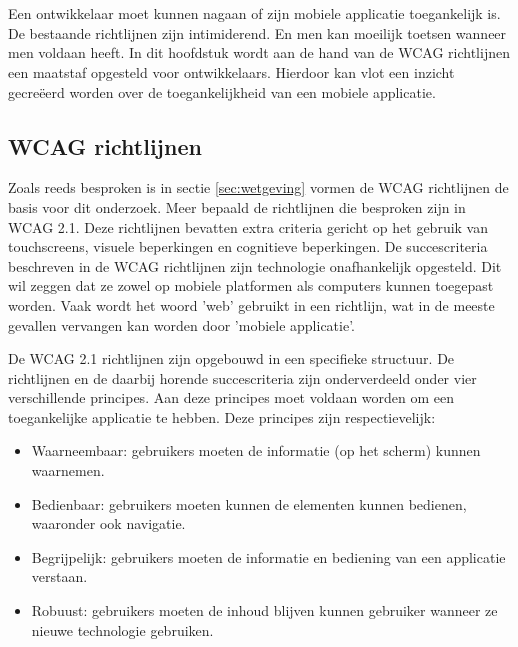 \chapter{}
\label{ch:Richtlijnen voor toegankelijkheid mobiele applicaties}
Een ontwikkelaar moet kunnen nagaan of zijn mobiele applicatie toegankelijk is. De bestaande richtlijnen zijn intimiderend. En men kan moeilijk toetsen wanneer men voldaan heeft. In dit hoofdstuk wordt aan de hand van de WCAG richtlijnen een maatstaf opgesteld voor ontwikkelaars. Hierdoor kan vlot een inzicht gecreëerd worden over de toegankelijkheid van een mobiele applicatie.

\section{WCAG richtlijnen}
\label{sec:WCAGrichtlijn}

Zoals reeds besproken is in sectie \ref{sec:wetgeving} vormen de WCAG richtlijnen de basis voor dit onderzoek. Meer bepaald de richtlijnen die besproken zijn in WCAG 2.1. Deze richtlijnen bevatten extra criteria gericht op het gebruik van touchscreens, visuele beperkingen en cognitieve beperkingen.
De succescriteria beschreven in de WCAG richtlijnen zijn technologie onafhankelijk opgesteld. Dit wil zeggen dat ze zowel op mobiele platformen als computers kunnen toegepast worden. Vaak wordt het woord 'web' gebruikt in een richtlijn, wat in de meeste gevallen vervangen kan worden door 'mobiele applicatie'.
 \autocite{w3cTechnologyNeutral}

De WCAG 2.1 richtlijnen zijn opgebouwd in een specifieke structuur. De richtlijnen en de daarbij horende succescriteria zijn onderverdeeld onder vier verschillende principes. Aan deze principes moet voldaan worden om een toegankelijke applicatie te hebben. Deze principes zijn respectievelijk: 
\begin{itemize}
    \item Waarneembaar: gebruikers moeten de informatie (op het scherm) kunnen waarnemen.
        \item Bedienbaar: gebruikers moeten kunnen de elementen kunnen bedienen, waaronder ook navigatie.
        \item Begrijpelijk: gebruikers moeten de informatie en bediening van een applicatie verstaan.
        \item Robuust: gebruikers moeten de inhoud blijven kunnen gebruiker wanneer ze nieuwe technologie gebruiken.
\end{itemize}

